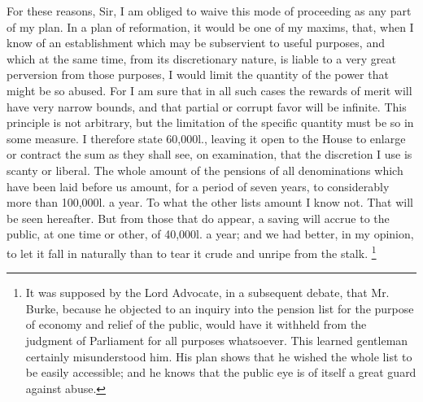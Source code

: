 For these reasons, Sir, I am obliged to waive this mode of proceeding as any part of my plan. In a plan of reformation, it would be one of my maxims, that, when I know of an establishment which may be subservient to useful purposes, and which at the same time, from its discretionary nature, is liable to a very great perversion from those purposes, I would limit the quantity of the power that might be so abused. For I am sure that in all such cases the rewards of merit will have very narrow bounds, and that partial or corrupt favor will be infinite. This principle is not arbitrary, but the limitation of the specific quantity must be so in some measure. I therefore state 60,000l., leaving it open to the House to enlarge or contract the sum as they shall see, on examination, that the discretion I use is scanty or liberal. The whole amount of the pensions of all denominations which have been laid before us amount, for a period of seven years, to considerably more than 100,000l. a year. To what the other lists amount I know not. That will be seen hereafter. But from those that do appear, a saving will accrue to the public, at one time or other, of 40,000l. a year; and we had better, in my opinion, to let it fall in naturally than to tear it crude and unripe from the stalk.
\footnote{ It was supposed by the Lord Advocate, in a subsequent debate, that Mr. Burke, because he objected to an inquiry into the pension list for the purpose of economy and relief of the public, would have it withheld from the judgment of Parliament for all purposes whatsoever. This learned gentleman certainly misunderstood him. His plan shows that he wished the whole list to be easily accessible; and he knows that the public eye is of itself a great guard against abuse.}


